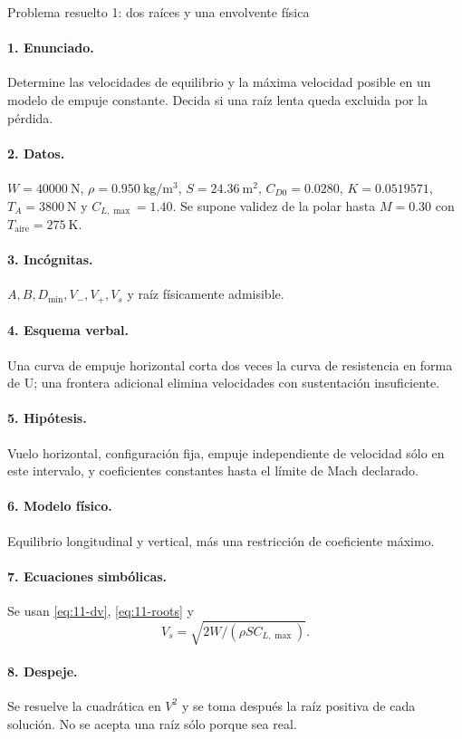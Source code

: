 \begin{studiumworked}{Problema resuelto 1: dos raíces y una envolvente física}

\paragraph{1. Enunciado.} Determine las velocidades de equilibrio y la máxima velocidad posible en un modelo de empuje constante. Decida si una raíz lenta queda excluida por la pérdida.
\paragraph{2. Datos.} $W=40000\ \mathrm N$, $\rho=0.950\ \mathrm{kg/m^3}$, $S=24.36\ \mathrm{m^2}$, $C_{D0}=0.0280$, $K=0.0519571$, $T_A=3800\ \mathrm N$ y $C_{L,\max}=1.40$. Se supone validez de la polar hasta $M=0.30$ con $T_{\mathrm{aire}}=275\ \mathrm K$.
\paragraph{3. Incógnitas.} $A,B,D_{\min},V_-,V_+,V_s$ y raíz físicamente admisible.
\paragraph{4. Esquema verbal.} Una curva de empuje horizontal corta dos veces la curva de resistencia en forma de U; una frontera adicional elimina velocidades con sustentación insuficiente.
\paragraph{5. Hipótesis.} Vuelo horizontal, configuración fija, empuje independiente de velocidad sólo en este intervalo, y coeficientes constantes hasta el límite de Mach declarado.
\paragraph{6. Modelo físico.} Equilibrio longitudinal y vertical, más una restricción de coeficiente máximo.
\paragraph{7. Ecuaciones simbólicas.} Se usan \eqref{eq:11-dv}, \eqref{eq:11-roots} y \[V_s=\sqrt{2W/(\rho SC_{L,\max})}.\]
\paragraph{8. Despeje.} Se resuelve la cuadrática en $V^2$ y se toma después la raíz positiva de cada solución. No se acepta una raíz sólo porque sea real.

\end{studiumworked}
